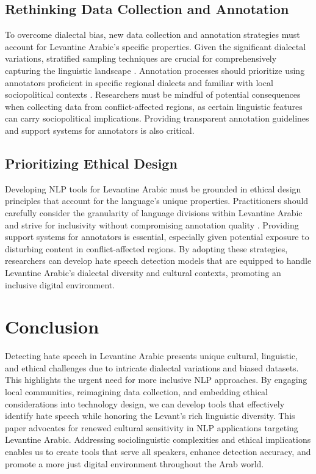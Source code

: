 \documentclass[11pt]{article}
\begin{document}
\subsection{Rethinking Data Collection and Annotation}

To overcome dialectal bias, new data collection and annotation strategies must account for Levantine Arabic's specific properties. Given the significant dialectal variations, stratified sampling techniques are crucial for comprehensively capturing the linguistic landscape \citep{bergman2022responsiblenaturallanguageannotation}. Annotation processes should prioritize using annotators proficient in specific regional dialects and familiar with local sociopolitical contexts \citep{doi:10.1126/science.aal4230, radiya-dixit_bogen_2024}. Researchers must be mindful of potential consequences when collecting data from conflict-affected regions, as certain linguistic features can carry sociopolitical implications. Providing transparent annotation guidelines and support systems for annotators is also critical.


\subsection{Prioritizing Ethical Design}

Developing NLP tools for Levantine Arabic must be grounded in ethical design principles that account for the language's unique properties. Practitioners should carefully consider the granularity of language divisions within Levantine Arabic and strive for inclusivity without compromising annotation quality \citep{bergman2022responsiblenaturallanguageannotation}. Providing support systems for annotators is essential, especially given potential exposure to disturbing content in conflict-affected regions. By adopting these strategies, researchers can develop hate speech detection models that are equipped to handle Levantine Arabic's dialectal diversity and cultural contexts, promoting an inclusive digital environment.


\section{Conclusion}

Detecting hate speech in Levantine Arabic presents unique cultural, linguistic, and ethical challenges due to intricate dialectal variations and biased datasets. This highlights the urgent need for more inclusive NLP approaches. By engaging local communities, reimagining data collection, and embedding ethical considerations into technology design, we can develop tools that effectively identify hate speech while honoring the Levant's rich linguistic diversity. This paper advocates for renewed cultural sensitivity in NLP applications targeting Levantine Arabic. Addressing sociolinguistic complexities and ethical implications enables us to create tools that serve all speakers, enhance detection accuracy, and promote a more just digital environment throughout the Arab world.
\end{document}
